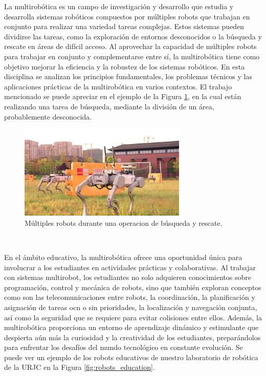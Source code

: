 
La multirobótica es un campo de investigación y desarrollo que estudia y
desarrolla sistemas robóticos compuestos por múltiples robots que trabajan en
conjunto para realizar una variedad tareas complejas.
Estos sistemas pueden dividirse las tareas, como la exploración de entornos
desconocidos o la búsqueda y rescate en áreas de difícil acceso.
Al aprovechar la capacidad de múltiples robots para trabajar en conjunto y
complementarse entre sí, la multirobótica tiene como objetivo mejorar la
eficiencia y la robustez de los sistemas robóticos.
En esta disciplina se analizan los principios fundamentales, los problemas
técnicos y las aplicaciones prácticas de la multirobótica en varios contextos.
El trabajo mencionado se puede apreciar en el ejemplo de la Figura
\ref{fig:multirobots}, en la cual están realizando una tarea de búsqueda,
mediante la división de un área, probablemente desconocida.

\begin{figure} [h!]
  \begin{center}
    \includegraphics[width=8cm]{figs/multirobotics_in_search_and_rescue}
  \end{center}
  \caption{Múltiples robots durante una operacion de búsqueda y rescate.}
  \label{fig:multirobots}
\end{figure}\

En el ámbito educativo, la multirobótica ofrece una oportunidad única para
involucrar a los estudiantes en actividades prácticas y colaborativas.
Al trabajar con sistemas multirobot, los estudiantes no solo adquieren
conocimientos sobre programación, control y mecánica de robots, sino que también
exploran conceptos como son las telecomunicaciones entre robots, la coordinación,
la planificación y asignación de tareas ocn o sin prioridades, la localización y
navegación conjunta, así como la seguridad que se requiere para evitar
colisiones entre ellos.
Además, la multirobótica proporciona un entorno de aprendizaje dinámico y
estimulante que despierta aún más la curiosidad y la creatividad de los
estudiantes, preparándolos para enfrentar los desafíos del mundo tecnológico en
constante evolución. Se puede ver un ejemplo de los robots educativos de nuestro
laboratorio de robótica de la URJC en la Figura \ref{fig:robots_education}.

